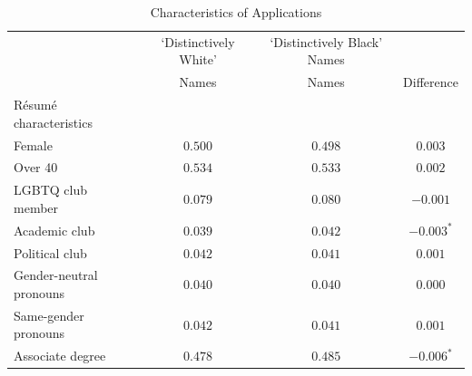 \documentclass[12pt]{article}
\begin{document}
\begin{table}[!b]
  \centering
  \caption{Characteristics of Applications}
  \begin{tabular}{lccc}
    \toprule
    & {\small`Distinctively White' } & {\small`Distinctively Black' Names} & \\
    & {\small Names} & {\small Names} & {\small Difference} \\
    \midrule
    Résumé characteristics \\
    \quad Female & $0.500$ & $0.498$ & $0.003$ \\
    \quad Over 40 & $0.534$ & $0.533$ & $0.002$ \\
    \quad LGBTQ club member & $0.079$ & $0.080$ & $-0.001$ \\
    \quad Academic club & $0.039$ & $0.042$ & $-0.003^{*}$ \\
    \quad Political club & $0.042$ & $0.041$ & $0.001$ \\
    \quad Gender-neutral pronouns & $0.040$ & $0.040$ & $0.000$ \\
    \quad Same-gender pronouns & $0.042$ & $0.041$ & $0.001$ \\
    \quad Associate degree & $0.478$ & $0.485$ & $-0.006^{*}$ \\
    \bottomrule
  \end{tabular}
\end{table}
\end{document}
